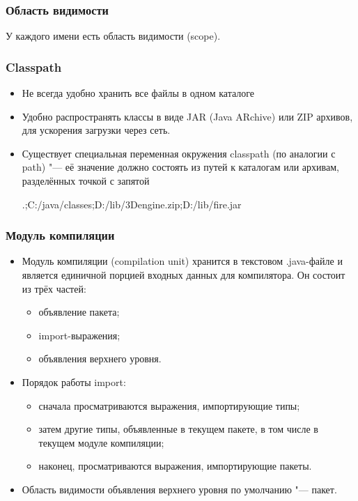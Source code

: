 \documentclass[default]{beamer}
\begin{document}
	\begin{frame}
		\frametitle{Область видимости}
		
		У каждого имени есть область видимости (scope).
		
		\lstScope
	\end{frame}

	\begin{frame}
		\frametitle{Classpath}
		
		\begin{itemize}
			\item Не всегда удобно хранить все файлы в одном каталоге
			\item Удобно распространять классы в виде JAR (Java ARchive) или ZIP архивов, для ускорения загрузки через сеть.
			\item Существует специальная переменная окружения classpath (по аналогии с path) "--- её значение должно состоять из путей к каталогам или архивам, разделённых точкой с запятой
			
			.;C:/java/classes;D:/lib/3Dengine.zip;D:/lib/fire.jar
		\end{itemize}
	\end{frame}


	\begin{frame}
		\frametitle{Модуль компиляции}
		
		\begin{itemize}
			\item Модуль компиляции (compilation unit) хранится в текстовом .java-файле и является единичной порцией входных данных для компилятора. Он состоит из трёх частей:
			\begin{itemize}
				\item объявление пакета;
				\item import-выражения;
				\item объявления верхнего уровня.
			\end{itemize}
			\item Порядок работы import:
			\begin{itemize}
				\item сначала просматриваются выражения, импортирующие типы;
				\item затем другие типы, объявленные в текущем пакете, в том числе в текущем модуле компиляции;
				\item наконец, просматриваются выражения, импортирующие пакеты.
			\end{itemize}
			\item Область видимости объявления верхнего уровня по умолчанию "--- пакет.
		\end{itemize}
	\end{frame}
\end{document}
